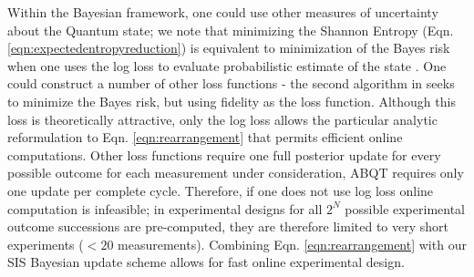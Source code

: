 \documentclass[aps,twocolumn,prl]{revtex4-1}
\begin{document}
Within the Bayesian framework, one could use other measures of uncertainty about the Quantum state; we note that minimizing the Shannon Entropy (Eqn. \eqref{eqn:expectedentropyreduction}) is equivalent to minimization of the Bayes risk when one uses the log loss to evaluate probabilistic estimate of the state \cite{Dawid2007}. One could construct a number of other loss functions - the second algorithm in \cite{SelfLearning} seeks to minimize the Bayes risk, but using fidelity as the loss function. Although this loss is theoretically attractive, only the log loss allows the particular analytic reformulation to Eqn. \eqref{eqn:rearrangement} that permits efficient online computations. Other loss functions require one full posterior update for every possible outcome for each measurement under consideration, ABQT requires only one update per complete cycle. Therefore, if one does not use log loss online computation is infeasible; in \cite{SelfLearningExperimental} experimental designs for all $2^N$ possible experimental outcome successions are pre-computed, they are therefore limited to very short experiments ($< 20$ measurements). Combining Eqn. \eqref{eqn:rearrangement} with our SIS Bayesian update scheme allows for fast online experimental design.
\end{document}
